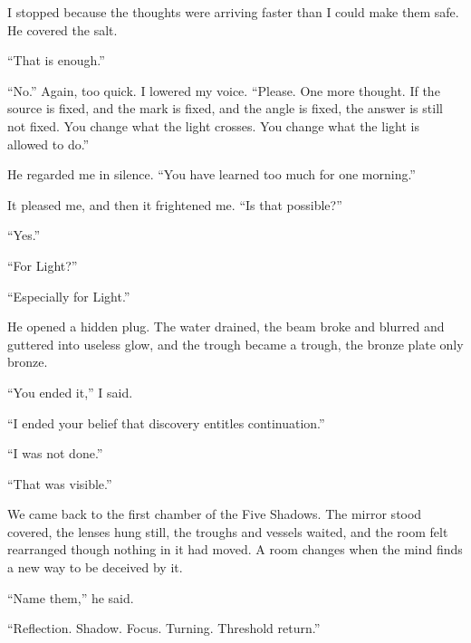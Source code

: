 I stopped because the thoughts were arriving faster than I could make them safe. He covered the salt.\par

``That is enough.''\par

``No.'' Again, too quick. I lowered my voice. ``Please. One more thought. If the source is fixed, and the mark is fixed, and the angle is fixed, the answer is still not fixed. You change what the light crosses. You change what the light is allowed to do.''\par

He regarded me in silence. ``You have learned too much for one morning.''\par

It pleased me, and then it frightened me. ``Is that possible?''\par

``Yes.''\par

``For Light?''\par

``Especially for Light.''\par

He opened a hidden plug. The water drained, the beam broke and blurred and guttered into useless glow, and the trough became a trough, the bronze plate only bronze.\par

``You ended it,'' I said.\par

``I ended your belief that discovery entitles continuation.''\par

``I was not done.''\par

``That was visible.''\par

\ornament

We came back to the first chamber of the Five Shadows. The mirror stood covered, the lenses hung still, the troughs and vessels waited, and the room felt rearranged though nothing in it had moved. A room changes when the mind finds a new way to be deceived by it.\par

``Name them,'' he said.\par

``Reflection. Shadow. Focus. Turning. Threshold return.''\par

